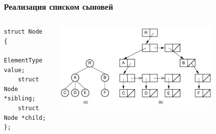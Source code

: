 \documentclass{../../slides-style}
\begin{document}
    \begin{frame}[fragile]
        \frametitle{Реализация списком сыновей}
        \begin{columns}
            \begin{column}{0.3\textwidth}
                \begin{footnotesize}
                    \begin{verbatim}
struct Node
{
    ElementType value;
    struct Node *sibling;
    struct Node *child;
};
                    \end{verbatim}
                \end{footnotesize}
            \end{column}
            \begin{column}{0.7\textwidth}
                \begin{center}
                    \includegraphics[width=0.8\textwidth]{children-list.png}
                \end{center}
            \end{column}
        \end{columns}
    \end{frame}
\end{document}
